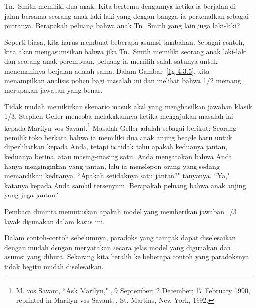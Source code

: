 \begin{example}\label{exam 4.3.2}
Tn.\ Smith memiliki dua anak.  Kita bertemu dengannya ketika ia berjalan di jalan
bersama seorang anak laki-laki yang dengan bangga ia perkenalkan sebagai putranya.
Berapakah peluang bahwa anak Tn.\ Smith yang lain juga laki-laki?
\par
Seperti biasa, kita harus membuat beberapa asumsi tambahan.  Sebagai contoh, kita
akan mengasumsikan bahwa jika Tn.\ Smith memiliki seorang anak laki-laki dan seorang
anak perempuan, peluang ia memilih salah satunya untuk menemaninya berjalan adalah
sama. Dalam Gambar~\ref{fig 4.3.5}, kita menampilkan analisis pohon bagi masalah ini
dan melihat bahwa 1/2 memang merupakan jawaban yang benar.
\end{example}

\begin{example}\label{exam 4.3.3}
Tidak mudah memikirkan skenario masuk akal yang menghasilkan jawaban klasik 1/3.
Stephen Geller mencoba melakukannya ketika mengajukan masalah ini kepada Marilyn vos
Savant.\footnote{M. vos Savant, ``Ask Marilyn," , 9  September;  2 December;  17  February 1990, reprinted in Marilyn
vos Savant, , St. Martins, New York, 1992.}
Masalah Geller adalah sebagai berikut: Seorang pemilik toko berkata bahwa ia memiliki
dua anak anjing beagle baru untuk diperlihatkan kepada Anda, tetapi ia tidak tahu
apakah keduanya jantan, keduanya betina, atau masing-masing satu.  Anda mengatakan
bahwa Anda hanya menginginkan yang jantan, lalu ia menelepon orang yang sedang
memandikan keduanya.  ``Apakah setidaknya satu jantan?" tanyanya. ``Ya," katanya
kepada Anda sambil tersenyum.  Berapakah peluang bahwa anak anjing yang 
juga jantan?
\par
Pembaca diminta memutuskan apakah model yang memberikan jawaban 1/3 layak digunakan
dalam kasus ini.
\end{example}

Dalam contoh-contoh sebelumnya, paradoks yang tampak dapat diselesaikan dengan mudah
dengan menyatakan secara jelas model yang digunakan dan asumsi yang dibuat.  Sekarang
kita beralih ke beberapa contoh yang paradoksnya tidak begitu mudah diselesaikan.

